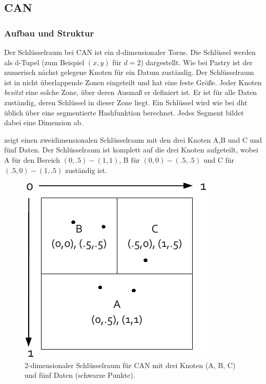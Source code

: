 \subsection{CAN}
\label{chap:evaluation_can}

\subsubsection*{Aufbau und Struktur}
Der Schlüsselraum bei CAN \cite{Ratnasamy2001Scalable} ist ein d-dimensionaler Torus. Die Schlüssel werden als d-Tupel (zum Beispiel $(x,y)$ für $d=2$) dargestellt. Wie bei Pastry ist der numerisch nächst gelegene Knoten für ein Datum zuständig. Der Schlüsselraum ist in nicht überlappende Zonen eingeteilt und hat eine feste Größe. Jeder Knoten \emph{besitzt} eine solche Zone, über deren Ausmaß er definiert ist. Er ist für alle Daten zuständig, deren Schlüssel in dieser Zone liegt. Ein Schlüssel wird wie bei \ac{dht} üblich über eine segmentierte Hashfunktion berechnet. Jedes Segment bildet dabei eine Dimension ab.

 zeigt einen zweidimensionalen Schlüsselraum mit den drei Knoten A,B und C und fünf Daten. Der Schlüsselraum ist komplett auf die drei Knoten aufgeteilt, wobei A für den Bereich $(0, .5)-(1, 1)$, B für $(0, 0)-(.5, .5)$ und C für $(.5, 0)-(1, .5)$ zuständig ist.

\begin{figure}[htbp]
\centering
\includegraphics{grafics/can_key_space.pdf}
\caption{2-dimensionaler Schlüsselraum für CAN mit drei Knoten (A, B, C) und fünf Daten (schwarze Punkte).}
\label{fig:can_key_space}
\end{figure}

